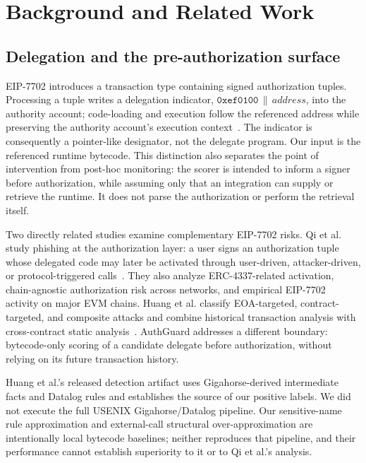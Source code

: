 \section{Background and Related Work}
\label{sec:background_related}

\subsection{Delegation and the pre-authorization surface}

EIP-7702 introduces a transaction type containing signed authorization tuples. Processing a tuple writes a delegation indicator, $\mathtt{0xef0100}\,\|\,\textit{address}$, into the authority account; code-loading and execution follow the referenced address while preserving the authority account's execution context~\cite{eip7702}. The indicator is consequently a pointer-like designator, not the delegate program. Our input is the referenced runtime bytecode. This distinction also separates the point of intervention from post-hoc monitoring: the scorer is intended to inform a signer before authorization, while assuming only that an integration can supply or retrieve the runtime. It does not parse the authorization or perform the retrieval itself.

Two directly related studies examine complementary EIP-7702 risks. Qi et al. study phishing at the authorization layer: a user signs an authorization tuple whose delegated code may later be activated through user-driven, attacker-driven, or protocol-triggered calls~\cite{qi2025eip7702phishing}. They also analyze ERC-4337-related activation, chain-agnostic authorization risk across networks, and empirical EIP-7702 activity on major EVM chains. Huang et al. classify EOA-targeted, contract-targeted, and composite attacks and combine historical transaction analysis with cross-contract static analysis~\cite{huang2026darkside}. AuthGuard addresses a different boundary: bytecode-only scoring of a candidate delegate before authorization, without relying on its future transaction history.

Huang et al.'s released detection artifact uses Gigahorse-derived intermediate facts and Datalog rules and establishes the source of our positive labels. We did not execute the full USENIX Gigahorse/Datalog pipeline. Our sensitive-name rule approximation and external-call structural over-approximation are intentionally local bytecode baselines; neither reproduces that pipeline, and their performance cannot establish superiority to it or to Qi et al.'s analysis.

